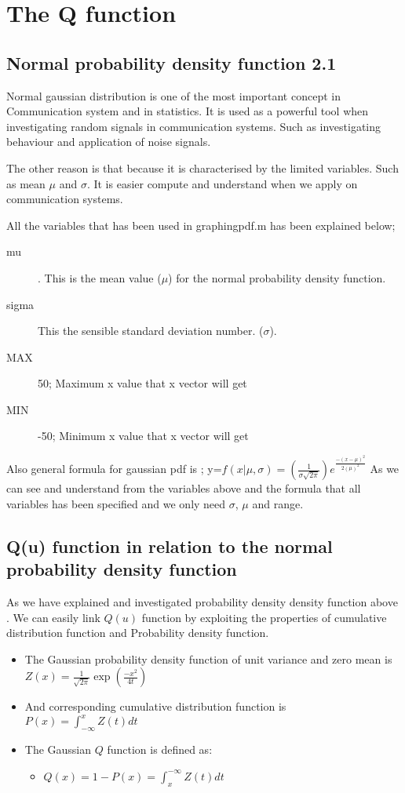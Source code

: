 \section{The Q function}

\subsection{Normal probability density function 2.1}
Normal gaussian distribution is one of the most important concept in Communication system and in statistics. It is used as a powerful tool when investigating random signals in communication systems.  Such as investigating behaviour and application of noise signals.

The other reason is that because it is characterised by the limited variables. Such as mean $\mu$ and $\sigma$. It is easier compute and understand when we apply on communication systems.

All the variables that has been used in graphingpdf.m has been explained below;

\begin{description}
	\item [mu] . This is the mean value ($\mu$) for the normal probability density function.
	\item [sigma] This the sensible standard deviation number. ($\sigma$).
	\item [MAX] 50; Maximum x value that x vector will get 
	\item [MIN] -50; Minimum x value that x vector will get
\end{description}

Also general formula for gaussian pdf is ;
y=$f(x|\mu,\sigma)=(\frac{1}{\sigma \sqrt{2 \pi}}) e^{\frac{-(x-\mu)^2}{2(\mu)^2}}$
As we can see and understand from the variables above and the formula that all variables has been specified and we only need $\sigma$, $\mu$ and range.

\subsection{Q(u) function in relation to the normal probability density function}
As we have explained and investigated probability density density function above . We can easily link $Q(u)$ function by exploiting the properties of cumulative distribution function and Probability density function.
\begin{itemize}
	\item The Gaussian probability density function of unit variance and zero mean is $Z(x)=\frac{1}{\sqrt{2\pi}} \exp(\frac{-x^2}{4t})$
	\item And corresponding cumulative distribution function is $P(x)=\int_{-\infty}^{x} Z(t) dt$
	\item The Gaussian $Q$ function is defined as:
		\begin{itemize}
			\item $ Q(x) = 1-P(x)=\int_{x}^{-\infty} Z(t) dt$
		\end{itemize}
\end{itemize}

